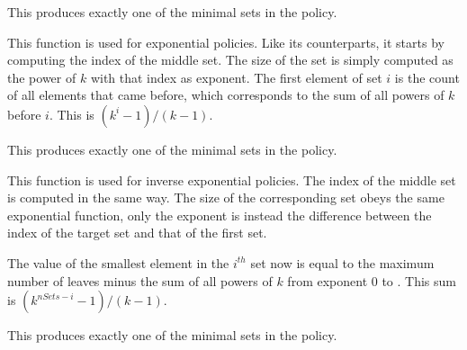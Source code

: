 \documentclass{article}
\begin{document}
\begin{description}
This produces exactly one of the minimal sets in the policy.

\item[\code{middleSetExpPol}] This function is used for exponential policies. Like its counterparts, it starts by computing the index of the middle set. The size of the set is simply computed as the power of $k$ with that index as exponent. The first element of set $i$ is the count of all elements that came before, which corresponds to the sum of all powers of $k$ before $i$. This is $(k^i - 1)/(k-1)$.

This produces exactly one of the minimal sets in the policy.

\item[\code{middleSetExpPolInv}] This function is used for inverse exponential policies. The index of the middle set is computed in the same way. The size of the corresponding set obeys the same exponential function, only the exponent is instead the difference between the index of the target set and that of the first set.

The value of the smallest element in the $i^{th}$ set now is equal to the maximum number of leaves minus the sum of all powers of $k$ from exponent $0$ to . This sum is $(k^{nSets-i}-1)/(k-1)$.

This produces exactly one of the minimal sets in the policy.
\end{description}
\end{document}
